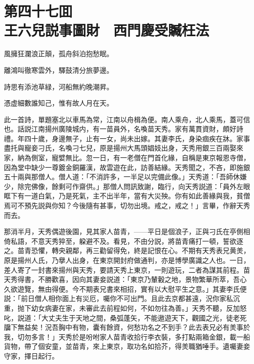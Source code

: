 
\chapter*{第四十七囬　\\王六兒説事圖財　西門慶受贓枉法}


\begin{myquote}
風擁狂瀾浪正顛，孤舟斜泊抱愁眠。

離鴻叫徹寒雲外，驛鼓清分旅夢邊。

詩思有添池草緑，河船無約晚潮昇。

憑虚細數誰知己，惟有故人月在天。
\end{myquote}

此一首詩，單題塞北以車馬為常，江南以舟楫為便。南人乘舟，北人乘馬，蓋可信也。話説江南揚州廣陵城内，有一苗員外，名喚苗天秀。家有萬貫資財，頗好詩禮。年四十歲，身邊無子，止有一女，尚未出嫁。其妻李氏，身染痼疾在牀。家事盡托與寵妾刁氏，名喚刁七兒，原是揚州大馬頭娼妓出身，天秀用銀三百兩娶來家，納為側室，寵嬖無比。忽一日，有一老僧在門首化緣，自稱是東京報恩寺僧，因為堂中缺少一尊鍍金銅羅漢，故雲遊在此，訪善結緣。天秀聞之，不吝，即施銀五十兩與那僧人。僧人道：「不消許多，一半足以完備此像。」天秀道：「吾師休嫌少，除完佛像，餘剩可作齋供。」那僧人問訊致謝，臨行，向天秀説道：「員外左眼眶下有一道白氣，乃是死氣，主不出半年，當有大災殃。你有如此善緣與我，貧僧焉可不預先説與你知？今後隨有甚事，切勿出境。戒之，戒之！」言畢，作辭天秀而去。

那消半月，天秀偶遊後園，見其家人苗青，——平日是個浪子，正與刁氏在亭側相倚私語，不意天秀猝至，躱避不及。看見，不由分説，將苗青痛打一頓，誓欲逐之。苗青恐懼，轉央親鄰，再三勸留得免，終是記恨在心。不期有天秀表兄黄羙，原是揚州人氏，乃擧人出身，在東京開封府做通判，亦是博學廣識之人也。一日，差人寄了一封書來揚州與天秀，要請天秀上東京，一則遊玩，二者為謀其前程。苗天秀得書，不勝歡喜，因向其妻妾説道：「東京乃輦轂之地，景物繁華所萃，吾心久欲遊覽，無由得便。今不期表兄書來相招，實有以大慰平生之意。」其妻李氏便説：「前日僧人相你面上有災厄，囑你不可出門。且此去京都甚遠，況你家私沉重，抛下幼女病妻在家，未審此去前程如何，不如勿往為善。」天秀不聽，反加怒叱，説道：「大丈夫生于天地之間，桑弧蓬矢，不能遨遊天下，觀國之光，徒老死牖下無益矣！況吾胸中有物，囊有餘資，何愁功名之不到手？此去表兄必有羙事於我，切勿多言！」天秀於是吩咐家人苗青收拾行李衣裝，多打點兩箱金銀，載一船貨物，帶了個安童，並苗青，來上東京，取功名如拾芥，得羙職猶唾手。遺囑妻妾守家，擇日起行。

